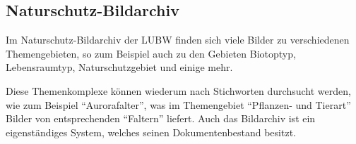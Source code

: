 \subsection{Naturschutz-Bildarchiv} \label{Bilddatenbank}
Im Naturschutz-Bildarchiv der \ac{LUBW} finden sich viele Bilder zu verschiedenen Themengebieten, so zum Beispiel auch zu den Gebieten Biotoptyp, Lebensraumtyp, Naturschutzgebiet und einige mehr.
\cite{Naturschutz-Bildarchiv}

Diese Themenkomplexe k\"onnen wiederum nach Stichworten durchsucht werden, wie zum Beispiel "`Aurorafalter"', was im Themengebiet "`Pflanzen- und Tierart"' Bilder von entsprechenden "`Faltern"' liefert. Auch das Bildarchiv ist ein eigenst\"andiges System, welches seinen Dokumentenbestand besitzt.


